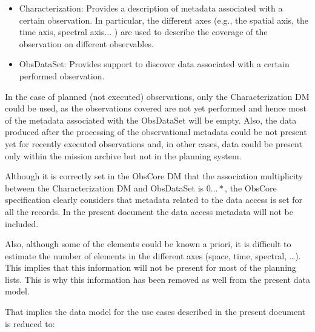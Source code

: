 \documentclass[11pt,a4paper]{ivoa}
\begin{document}
\begin{itemize}
	\item{Characterization: Provides a description of metadata associated with a
  certain observation. In particular, the different axes (e.g., the spatial
  axis, the time axis, spectral axis$ \ldots $ ) are used to describe the
  coverage of the observation on different observables.}

	\item{ObsDataSet: Provides support to discover data associated with a certain
  performed observation.}

\end{itemize}

In the case of planned (not executed) observations, only the Characterization
DM could be used, as the observations covered are not yet performed and hence
most of the metadata associated with the ObsDataSet will be empty. Also, the data
produced after the processing of the observational metadata could be not present
yet for recently executed observations and, in other cases, data could be
present only within the mission archive but not in the planning system.

Although it is correctly set in the ObsCore DM that the association multiplicity
between the Characterization DM and ObsDataSet is $0\ldots\ast$, the ObsCore
specification clearly considers that metadata related to the data access is set
for all the records. In the present document the data access metadata will not
be included.

Also, although some of the elements could be known a priori, it is difficult to
estimate the number of elements in the different axes (space, time, spectral,
\dots).
This implies that this information will not be present for most of the planning
lists. This is why this information has been removed as well from the present
data model.

That implies the data model for the use cases described in the present document
is reduced to:
\end{document}
